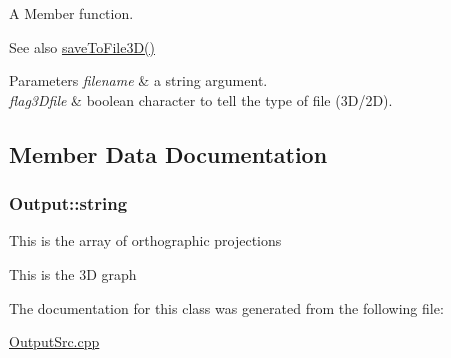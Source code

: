 A Member function. 

\begin{DoxySeeAlso}{See also}
\hyperlink{classOutput_aa16a2893d743f7c218c026efa3e65718}{save\+To\+File3\+D()} 
\end{DoxySeeAlso}

\begin{DoxyParams}{Parameters}
{\em filename} & a string argument. \\
\hline
{\em flag3\+Dfile} & boolean character to tell the type of file (3\+D/2D). \\
\hline
\end{DoxyParams}


\subsection{Member Data Documentation}
\subsubsection[{\texorpdfstring{string}{string}}]{\setlength{\rightskip}{0pt plus 5cm}Output\+::string}\hypertarget{classOutput_afb80842d973398a94444913d2c9167d3}{}\label{classOutput_afb80842d973398a94444913d2c9167d3}
This is the array of orthographic projections

This is the 3D graph 

The documentation for this class was generated from the following file\+:\begin{DoxyCompactItemize}
\item 
\hyperlink{OutputSrc_8cpp}{Output\+Src.\+cpp}\end{DoxyCompactItemize}
